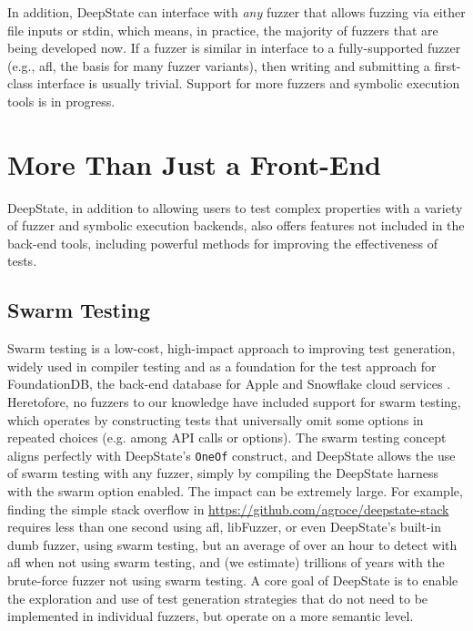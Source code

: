 \documentclass[sigconf]{acmart}
\begin{document}
In addition, DeepState can interface with \emph{any} fuzzer that allows fuzzing via either file inputs or stdin, which means, in practice, the majority of fuzzers that are being developed now.  If a fuzzer is similar in interface to a fully-supported fuzzer (e.g., afl, the basis for many fuzzer variants), then writing and submitting a first-class interface is usually trivial.  Support for more fuzzers and symbolic execution tools is in progress.

\section{More Than Just a Front-End}

DeepState, in addition to allowing users to test complex properties with a variety of fuzzer and symbolic execution backends, also offers features not included in the back-end tools, including powerful methods for improving the effectiveness of tests.

\subsection{Swarm Testing}

Swarm testing \cite{ISSTA12,groce2013help} is a low-cost, high-impact approach to improving test generation, widely used in compiler testing \cite{le2014compiler,dewey2015fuzzing} and as a foundation for the test approach for FoundationDB, the back-end database for Apple and Snowflake cloud services \cite{zhou2021foundationdb}.  Heretofore, no fuzzers to our knowledge have included support for swarm testing, which operates by constructing tests that universally omit some options in repeated choices (e.g. among API calls or options).  The swarm testing concept aligns perfectly with DeepState's {\tt OneOf} construct, and DeepState allows the use of swarm testing with any fuzzer, simply by compiling the DeepState harness with the swarm option enabled.  The impact can be extremely large.  For example, finding the simple stack overflow in \url{https://github.com/agroce/deepstate-stack} requires less than one second using afl, libFuzzer, or even DeepState's built-in dumb fuzzer, using swarm testing, but an average of over an hour to detect with afl when not using swarm testing, and (we estimate) trillions of years with the brute-force fuzzer not using swarm testing.  A core goal of DeepState is to enable the exploration and use of test generation strategies that do not need to be implemented in individual fuzzers, but operate on a more semantic level.
\end{document}
